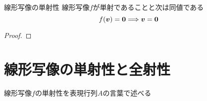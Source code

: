 \documentclass[../../../topic_linear-algebra]{subfiles}
\begin{document}
\sectionline

\begin{theorem}{線形写像の単射性}
  線形写像$f$が単射であることと次は同値である
  \begin{equation*}
    f(\vb*{v}) = \vb*{0} \Longrightarrow \vb*{v} = \vb*{0}
  \end{equation*}
\end{theorem}

\begin{proof}
\end{proof}

\sectionline
\section{線形写像の単射性と全射性}

線形写像$f$の単射性を表現行列$A$の言葉で述べる


\end{document}
